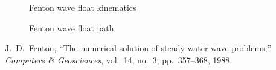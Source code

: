 \documentclass[11pt,letterpaper]{article}
\begin{document}
\begin{figure}[h]
    \centering
    \resizebox{\textwidth}{!}{}
    \caption{Fenton wave float kinematics}
    \label{fig:waveKinematics}
\end{figure}

\begin{figure}[h]
    \centering
    \resizebox{\textwidth}{!}{}
    \caption{Fenton wave float path}
    \label{fig:waveParticlePath}
\end{figure}

\begin{thebibliography}{1}
J.~D.~Fenton, “The numerical solution of steady water wave problems,” \emph{Computers \& Geosciences}, vol.~14, no.~3, pp.~357–368, 1988.
\end{thebibliography}
\end{document}
